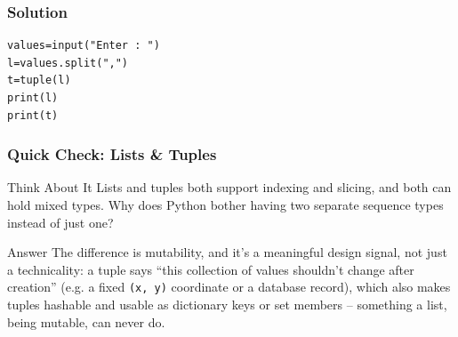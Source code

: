 \begin{frame}[fragile]\frametitle{Solution}
\begin{lstlisting}
values=input("Enter : ")
l=values.split(",")
t=tuple(l)
print(l)
print(t)
\end{lstlisting}
\end{frame}

\begin{frame}[fragile]\frametitle{Quick Check: Lists \& Tuples}
\begin{block}{Think About It}
Lists and tuples both support indexing and slicing, and both can hold mixed types. Why does Python bother having two separate sequence types instead of just one?
\end{block}
\pause
\begin{block}{Answer}
The difference is mutability, and it's a meaningful design signal, not just a technicality: a tuple says ``this collection of values shouldn't change after creation'' (e.g. a fixed \texttt{(x, y)} coordinate or a database record), which also makes tuples hashable and usable as dictionary keys or set members -- something a list, being mutable, can never do.
\end{block}
\end{frame}

%
%
%
%

